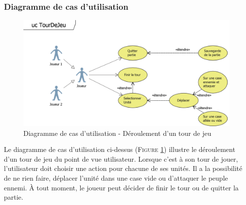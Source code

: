 \documentclass[a4paper,11pt]{article}
\begin{document}
		\subsubsection{Diagramme de cas d'utilisation}
			\begin{figure}[ht!]
				\includegraphics{Diagrammes/Tour/ucTourDeJeu.png}
				\caption{Diagramme de cas d'utilisation - Déroulement d'un tour de jeu}
				\label{fig:uctour}
			\end{figure}
			\vspace*{1cm}
			Le diagramme de cas d'utilisation ci-dessus (\textsc{Figure \ref{fig:uctour}}) illustre le déroulement d'un tour de jeu du point de vue utilisateur. Lorsque c'est à son tour de jouer, l'utilisateur doit choisir une action pour chacune de ses unités. Il a la possibilité de ne rien faire, déplacer l'unité dans une case vide ou d'attaquer le peuple ennemi. À  tout moment, le joueur peut décider de finir le tour ou de quitter la partie.
			\newpage
\end{document}
